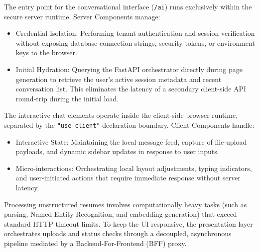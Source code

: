 \documentclass[12pt, a4paper]{report}
\begin{document}
\vspace{0.3cm}

The entry point for the conversational interface (\texttt{/ai}) runs exclusively within the secure server runtime. Server Components manage:
\begin{itemize}
    \item Credential Isolation: Performing tenant authentication and session verification without exposing database connection strings, security tokens, or environment keys to the browser.
    \item Initial Hydration: Querying the FastAPI orchestrator directly during page generation to retrieve the user's active session metadata and recent conversation list. This eliminates the latency of a secondary client-side API round-trip during the initial load.
\end{itemize}

\vspace{0.3cm}

The interactive chat elements operate inside the client-side browser runtime, separated by the \texttt{"use client"} declaration boundary. Client Components handle:
\begin{itemize}
    \item Interactive State: Maintaining the local message feed, capture of file-upload payloads, and dynamic sidebar updates in response to user inputs.
    \item Micro-interactions: Orchestrating local layout adjustments, typing indicators, and user-initiated actions that require immediate response without server latency.
\end{itemize}

\vspace{0.6cm}
\vspace{0.4cm}

Processing unstructured resumes involves computationally heavy tasks (such as parsing, Named Entity Recognition, and embedding generation) that exceed standard HTTP timeout limits. To keep the UI responsive, the presentation layer orchestrates uploads and status checks through a decoupled, asynchronous pipeline mediated by a Backend-For-Frontend (BFF) proxy.
\end{document}
